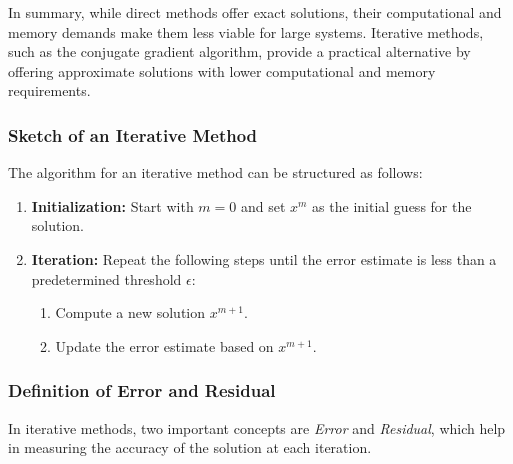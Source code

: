\documentclass[unicode,11pt,a4paper,oneside,numbers=endperiod,openany]{scrartcl}
\begin{document}
In summary, while direct methods offer exact solutions, their computational and memory demands make them less viable for large systems. Iterative methods, such as the conjugate gradient algorithm, provide a practical alternative by offering approximate solutions with lower computational and memory requirements.

\subsubsection{Sketch of an Iterative Method}

The algorithm for an iterative method can be structured as follows:

\begin{enumerate}
    \item \textbf{Initialization:} Start with \( m = 0 \) and set \( x^m \) as the initial guess for the solution.

    \item \textbf{Iteration:} Repeat the following steps until the error estimate is less than a predetermined threshold \( \epsilon \):
    \begin{enumerate}
        \item Compute a new solution \( x^{m+1} \).
        \item Update the error estimate based on \( x^{m+1} \).
    \end{enumerate}
\end{enumerate}

\subsubsection{Definition of Error and Residual}

In iterative methods, two important concepts are \textit{Error} and \textit{Residual}, which help in measuring the accuracy of the solution at each iteration.
\end{document}
